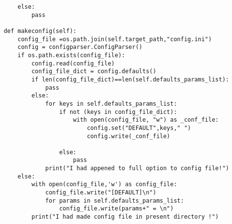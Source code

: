 \begin{verbatim}
        else:
            pass

    def makeconfig(self):
        config_file =os.path.join(self.target_path,"config.ini")
        config = configparser.ConfigParser()
        if os.path.exists(config_file):
            config.read(config_file)
            config_file_dict = config.defaults()
            if len(config_file_dict)==len(self.defaults_params_list):
                pass
            else:
                for keys in self.defaults_params_list:
                    if not (keys in config_file_dict):
                        with open(config_file, "w") as _conf_file: 
                            config.set("DEFAULT",keys," ")
                            config.write(_conf_file)
                            
                    else:
                        pass
                print("I had appened to full option to config file!")
        else:
            with open(config_file,'w') as config_file:
                config_file.write("[DEFAULT]\n")
                for params in self.defaults_params_list:
                    config_file.write(params+" = \n")
            print("I had made config file in present directory !")
 
\end{verbatim}

